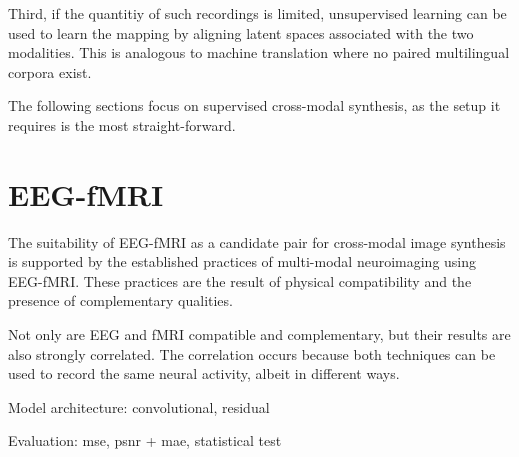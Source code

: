 \documentclass{article}
\begin{document}
Third, if the quantitiy of such recordings is limited, unsupervised learning can be used to learn the mapping by aligning latent spaces associated with the two modalities. This is analogous to machine translation where no paired multilingual corpora exist.

The following sections focus on supervised cross-modal synthesis, as the setup it requires is the most straight-forward.

\section{EEG-fMRI}

The suitability of EEG-fMRI as a candidate pair for cross-modal image synthesis is supported by the established practices of multi-modal neuroimaging using EEG-fMRI. These practices are the result of physical compatibility and the presence of complementary qualities.

Not only are EEG and fMRI compatible and complementary, but their results are also strongly correlated. The correlation occurs because both techniques can be used to record the same neural activity, albeit in different ways.

Model architecture: convolutional, residual

Evaluation: mse, psnr + mae, statistical test
\end{document}
